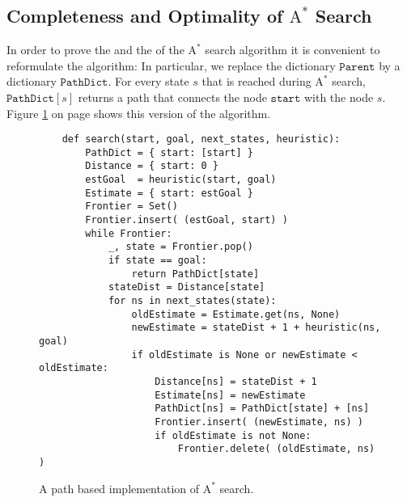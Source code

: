 \subsection{Completeness and Optimality of $\textrm{A}^*$ Search}
In order to prove the  and the  of the $\textrm{A}^*$ search algorithm it is convenient to
reformulate the algorithm:  In particular, we replace the dictionary $\texttt{Parent}$ by a dictionary
$\texttt{PathDict}$. For every state $s$ that is reached during $\textrm{A}^*$ search, $\texttt{PathDict}[s]$ returns a
path that connects the node $\texttt{start}$ with the node $s$.  Figure \ref{fig:A-Star-Search-Path.ipynb} on page
\pageref{fig:A-Star-Search-Path.ipynb} shows this version of the algorithm.


\begin{figure}[!ht]
\centering
\begin{verbatim}
    def search(start, goal, next_states, heuristic):
        PathDict = { start: [start] }
        Distance = { start: 0 }           
        estGoal  = heuristic(start, goal)
        Estimate = { start: estGoal }
        Frontier = Set()
        Frontier.insert( (estGoal, start) )
        while Frontier:
            _, state = Frontier.pop()
            if state == goal:
                return PathDict[state]
            stateDist = Distance[state]
            for ns in next_states(state):
                oldEstimate = Estimate.get(ns, None)
                newEstimate = stateDist + 1 + heuristic(ns, goal)
                if oldEstimate is None or newEstimate < oldEstimate:
                    Distance[ns] = stateDist + 1
                    Estimate[ns] = newEstimate
                    PathDict[ns] = PathDict[state] + [ns]
                    Frontier.insert( (newEstimate, ns) )
                    if oldEstimate is not None:
                        Frontier.delete( (oldEstimate, ns) )
\end{verbatim}
\vspace*{-0.3cm}
\caption{A path based implementation of $\textrm{A}^*$ search.}
\label{fig:A-Star-Search-Path.ipynb}
\end{figure}

